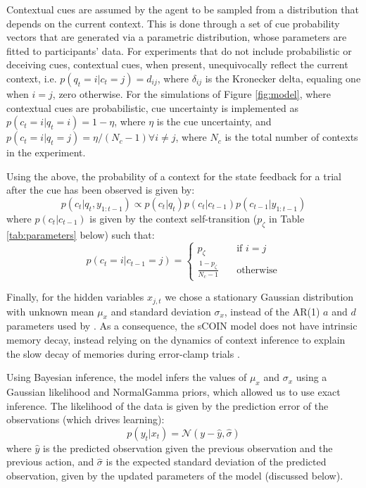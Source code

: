 \documentclass[a4paper,doc,floatsintext,natbib]{apa6}
\def \fref #1{Figure \ref{#1}}     %
\def \tref #1{Table \ref{#1}}      %
\begin{document}
Contextual cues are assumed by the agent to be sampled from a distribution that depends on the current context. This is done through a set of cue probability vectors that are generated via a parametric distribution, whose parameters are fitted to participants' data. For experiments that do not include probabilistic or deceiving cues, contextual cues, when present, unequivocally reflect the current context, i.e. $p(q_t = i | c_t = j) = d_{ij}$, where $\delta_{ij}$ is the Kronecker delta, equaling one when $i = j$, zero otherwise. For the simulations of \fref{fig:model}, where contextual cues are probabilistic, cue uncertainty is implemented as $p(c_t = i | q_t = i) = 1 - \eta$, where $\eta$ is the cue uncertainty, and $p(c_t = i | q_t = j) = \eta / (N_c-1) \forall i \ne j$, where $N_c$ is the total number of contexts in the experiment.

Using the above, the probability of a context for the state feedback for a trial after the cue has been observed is given by:
\begin{equation}
p(c_t | q_t, y_{1:t-1}) \propto p(c_t | q_t) p(c_t | c_{t-1}) p(c_{t-1} | y_{1:t-1})
\end{equation}
where $p(c_t | c_{t-1})$ is given by the context self-transition ($p_\zeta$ in \tref{tab:parameters} below) such that:
\begin{equation}
p(c_t = i | c_{t-1} = j) = \begin{cases}
                             p_\zeta &\quad \text{if } i = j \\
                             \frac{1 - p_\zeta}{N_c - 1} &\quad \text{otherwise}
                           \end{cases}
\end{equation}
                             
Finally, for the hidden variables $x_{j,t}$ we chose a stationary Gaussian distribution with unknown mean $\mu_x$ and standard deviation $\sigma_x$, instead of the AR(1) $a$ and $d$ parameters used by \cite{Heald_Contextual_2021}. As a consequence, the sCOIN model does not have intrinsic memory decay, instead relying on the dynamics of context inference to explain the slow decay of memories during error-clamp trials \citep[e.g.][]{Scheidt_Persistence_2000,Vaswani_Decay_2013,Brennan_Decay_2015}.

Using Bayesian inference, the model infers the values of $\mu_x$ and $\sigma_x$ using a Gaussian likelihood and NormalGamma priors, which allowed us to use exact inference. The likelihood of the data is given by the prediction error of the observations (which drives learning):
\begin{equation}
p(y_t | x_t) = \mathcal{N}(y - \hat y, \hat \sigma)
\end{equation}
where $\hat y$ is the predicted observation given the previous observation and the previous action, and $\hat \sigma$ is the expected standard deviation of the predicted observation, given by the updated parameters of the model (discussed below).
\end{document}
